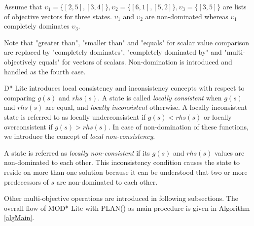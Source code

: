 \documentclass[10pt,journal]{IEEEtran}
\newenvironment{definition}[1][Definition]{\begin{trivlist}
\item[\hskip \labelsep {\bfseries #1}]}{\end{trivlist}}
\begin{document}
Assume that $\upsilon_{1}=\{[2,5],[3,4]\}, \upsilon_{2}=\{[6,1],[5,2]\}, \upsilon_{3}=\{[3,5]\}$ are lists of objective vectors for three states. $\upsilon_{1}$ and $\upsilon_{2}$ are non-dominated whereas $\upsilon_{1}$ completely dominates $\upsilon_{3}$. 

Note that "greater than", "smaller than" and "equals" for scalar value comparison are replaced by "completely dominates", "completely dominated by" and "multi-objectively equals" for vectors of scalars. Non-domination is introduced and handled as the fourth case.

D* Lite introduces local consistency and inconsistency concepts with respect to comparing $g(s)$ and $rhs(s)$. A state is called {\it locally consistent} when $g(s)$ and $rhs(s)$ are equal, and {\it locally inconsistent} otherwise. A locally inconsistent state is referred to as locally underconsistent if $g(s)<rhs(s)$ or locally overconsistent if $g(s)>rhs(s)$. In case of non-domination of these functions, we introduce the concept of {\it local non-consistency}.

\begin{definition}
A state is referred as \textit{locally non-consistent} if its $g(s)$ and $rhs(s)$ values are non-dominated to each other. This inconsistency condition causes the state to reside on more than one solution because it can be understood that two or more predecessors of $s$ are non-dominated to each other.
\end{definition}

Other multi-objective operations are introduced in following subsections. The overall flow of MOD* Lite with PLAN() as main procedure is given in Algorithm \ref{algMain}.
\end{document}
